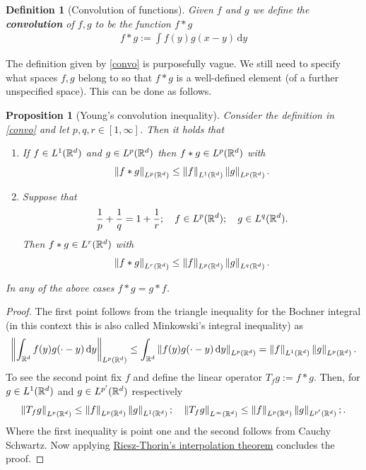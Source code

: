 \documentclass[12pt]{article}
\newtheorem{proposition}{Proposition}
\newtheorem{definition}{Definition}
\theoremstyle{remark}
\renewcommand{\norm}[1]{\left\lVert #1 \right\rVert}\renewcommand{\abs}[1]{\left| #1 \right|}
\renewcommand{\d}{\,\mathrm{d}}
\begin{document}
\begin{definition}[Convolution of functions]
	Given $f$ and $g$ we define the \textbf{convolution} of $f,g$ to be
	the function $f *g $
	\begin{align}\label{convo}
		f *g := \int f(y)g(x-y) \d y
	\end{align}
\end{definition}
The definition given by \eqref{convo} is purposefully vague. We still need to specify what spaces $f,g$ belong to so that  $f*g$ is a well-defined element (of a further unspecified space). This can be done as follows.
\begin{proposition}[Young's convolution inequality]\label{Young}
	Consider the definition in \eqref{convo} and let $p,q,r \in  [1, \infty]$. Then it holds that
	\begin{enumerate}
		\item If $f \in L^1(\mathbb{R}^d)$ and $g \in L^p(\mathbb{R}^d)$ then $f*g \in L^p(\mathbb{R}^d)$ with
		      \begin{align*}
			      \norm{f*g}_{L^p(\R^d)}\leq \norm{f}_{L^1(\R^d)}\norm{g}_{L^p(\R^d)}.
		      \end{align*}
		\item  Suppose that
		      \begin{align*}
			      \frac{1}{p}+\frac{1}{q}=1+\frac{1}{r}; \quad f \in L^p(\mathbb{R}^d); \quad g \in L^q(\mathbb{R}^d)    .
		      \end{align*}
		      Then $f*g \in L^r(\mathbb{R}^d)$ with
		      \begin{align*}
			      \norm{f*g}_{L^r(\R^d)}\leq \norm{f}_{L^p(\R^d)}\norm{g}_{L^q(\R^d)}.
		      \end{align*}
	\end{enumerate}
	\item In any of the above cases $f*g=g*f$.
\end{proposition}
\begin{proof}
	The first point follows from the triangle inequality for the Bochner integral (in this context this is also called Minkowski's integral inequality) as
	\begin{align*}
		\norm{\int_{\R^d}f(y)g(\cdot -y) \d y}_{L^p(\R^d)}\leq\int_{\R^d}\norm{f(y)g(\cdot -y) \d y}_{L^p(\R^d)}= \norm{f}_{L^1(\R^d)} \norm{g}_{L^p(\R^d)}.
	\end{align*}
	To see the second point fix $f$ and define the linear operator $T_fg:= f*g$. Then, for $g \in  L^1(\mathbb{R}^d)$ and $g \in  L^{p'}(\mathbb{R}^d)$ respectively
	\begin{align*}
		\norm{T_f g}_{L^p(\R^d)} \leq \norm{f}_{L^p(\R^d)} \norm{g}_{L^1(\R^d)}; \quad    \norm{T_f g}_{L^\infty(\R^d)} \leq \norm{f}_{L^p(\R^d)} \norm{g}_{L^{p'}(\R^d)};  .
	\end{align*}
	Where the first inequality is point one and the second follows from Cauchy Schwartz. Now applying \href{ https://en.wikipedia.org/wiki/Riesz%E2%80%93Thorin_theorem#:~:text=the%20sumset%20formulation.-,Riesz%E2%80%93Thorin,-interpolation%20theorem%C2%A0%E2%80%94%C2%A0}{Riesz-Thorin's interpolation theorem} concludes the proof.
\end{proof}
\end{document}
